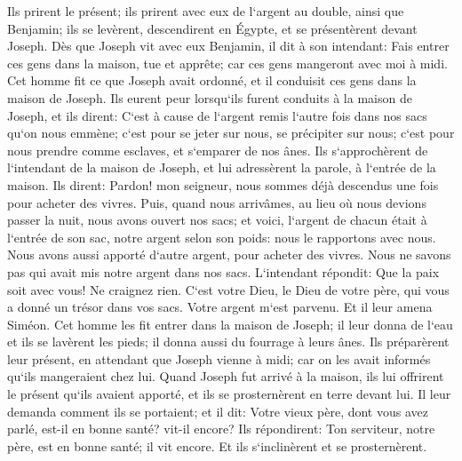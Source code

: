 \verse Ils prirent le présent; ils prirent avec eux de l`argent au double, ainsi que Benjamin; ils se levèrent, descendirent en Égypte, et se présentèrent devant Joseph. 
\verse Dès que Joseph vit avec eux Benjamin, il dit à son intendant: Fais entrer ces gens dans la maison, tue et apprête; car ces gens mangeront avec moi à midi. 
\verse Cet homme fit ce que Joseph avait ordonné, et il conduisit ces gens dans la maison de Joseph. 
\verse Ils eurent peur lorsqu`ils furent conduits à la maison de Joseph, et ils dirent: C`est à cause de l`argent remis l`autre fois dans nos sacs qu`on nous emmène; c`est pour se jeter sur nous, se précipiter sur nous; c`est pour nous prendre comme esclaves, et s`emparer de nos ânes. 
\verse Ils s`approchèrent de l`intendant de la maison de Joseph, et lui adressèrent la parole, à l`entrée de la maison. 
\verse Ils dirent: Pardon! mon seigneur, nous sommes déjà descendus une fois pour acheter des vivres. 
\verse Puis, quand nous arrivâmes, au lieu où nous devions passer la nuit, nous avons ouvert nos sacs; et voici, l`argent de chacun était à l`entrée de son sac, notre argent selon son poids: nous le rapportons avec nous. 
\verse Nous avons aussi apporté d`autre argent, pour acheter des vivres. Nous ne savons pas qui avait mis notre argent dans nos sacs. 
\verse L`intendant répondit: Que la paix soit avec vous! Ne craignez rien. C`est votre Dieu, le Dieu de votre père, qui vous a donné un trésor dans vos sacs. Votre argent m`est parvenu. Et il leur amena Siméon. 
\verse Cet homme les fit entrer dans la maison de Joseph; il leur donna de l`eau et ils se lavèrent les pieds; il donna aussi du fourrage à leurs ânes. 
\verse Ils préparèrent leur présent, en attendant que Joseph vienne à midi; car on les avait informés qu`ils mangeraient chez lui. 
\verse Quand Joseph fut arrivé à la maison, ils lui offrirent le présent qu`ils avaient apporté, et ils se prosternèrent en terre devant lui. 
\verse Il leur demanda comment ils se portaient; et il dit: Votre vieux père, dont vous avez parlé, est-il en bonne santé? vit-il encore? 
\verse Ils répondirent: Ton serviteur, notre père, est en bonne santé; il vit encore. Et ils s`inclinèrent et se prosternèrent. 
